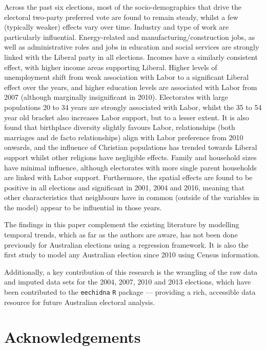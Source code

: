 \documentclass[times, doublespace]{anzsauth}
\begin{document}
Across the past six elections, most of the socio-demographics that drive the electoral two-party preferred vote are found to remain steady, whilst a few (typically weaker) effects vary over time. Industry and type of work are particularly influential. Energy-related and manufacturing/construction jobs, as well as administrative roles and jobs in education and social services are strongly linked with the Liberal party in all elections. Incomes have a similarly consistent effect, with higher income areas supporting Liberal. Higher levels of unemployment shift from weak association with Labor to a significant Liberal effect over the years, and higher education levels are associated with Labor from 2007 (although marginally insignificant in 2010). Electorates with large populations 20 to 34 years are strongly associated with Labor, whilst the 35 to 54 year old bracket also increases Labor support, but to a lesser extent. It is also found that birthplace diversity slightly favours Labor, relationships (both marriages and de facto relationships) align with Labor preference from 2010 onwards, and the influence of Christian populations has trended towards Liberal support whilst other religions have negligible effects. Family and household sizes have minimal influence, although electorates with more single parent households are linked with Labor support. Furthermore, the spatial effects are found to be positive in all elections and significant in 2001, 2004 and 2016, meaning that other characteristics that neighbours have in common (outside of the variables in the model) appear to be influential in those years.

The findings in this paper complement the existing literature by modelling temporal trends, which as far as the authors are aware, has not been done previously for Australian elections using a regression framework. It is also the first study to model any Australian election since 2010 using Census information.

Additionally, a key contribution of this research is the wrangling of the raw data and imputed data sets for the 2004, 2007, 2010 and 2013 elections, which have been contributed to the \texttt{eechidna} \texttt{R} package --- providing a rich, accessible data resource for future Australian electoral analysis.

\hypertarget{acknowledgements}{%
\section{Acknowledgements}\label{acknowledgements}}
\end{document}

